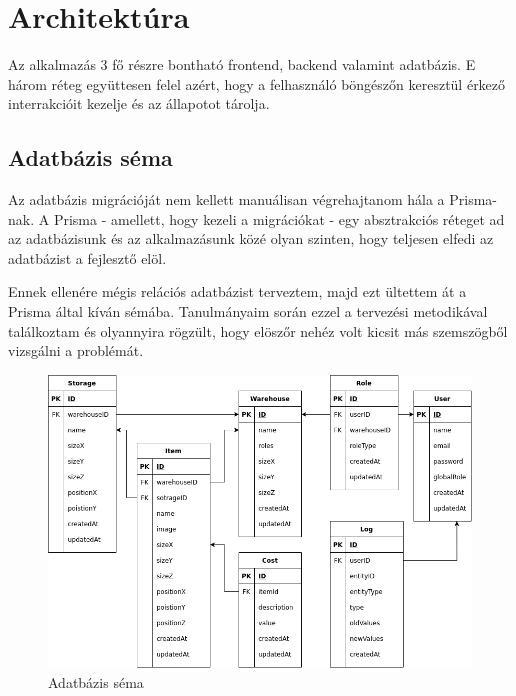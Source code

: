 \chapter{Architektúra}
Az alkalmazás 3 fő részre bontható frontend, backend valamint adatbázis.
E három réteg együttesen felel azért, hogy a felhasználó böngészőn keresztül érkező interrakcióit kezelje és az állapotot tárolja.

\section{Adatbázis séma}
Az adatbázis migrációját nem kellett manuálisan végrehajtanom hála a Prisma-nak. 
A Prisma - amellett, hogy kezeli a migrációkat - egy absztrakciós réteget ad az adatbázisunk és az alkalmazásunk közé olyan szinten, hogy teljesen elfedi az adatbázist a fejlesztő elöl.

Ennek ellenére mégis relációs adatbázist terveztem, majd ezt ültettem át a Prisma által kíván sémába.
Tanulmányaim során ezzel a tervezési metodikával találkoztam és olyannyira rögzült, hogy elöszőr nehéz volt kicsit más szemszögből vizsgálni a problémát.

\begin{figure}[!ht]
  \centering
  \includegraphics[width=150mm, keepaspectratio]{figures/db.png}
  \caption{Adatbázis séma}
  \label{fig:backend}
\end{figure}


